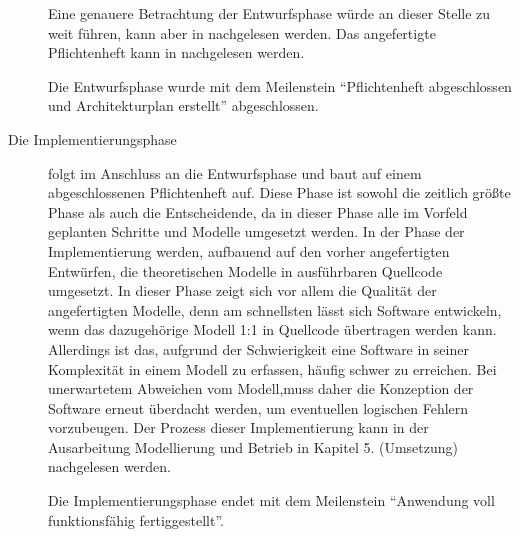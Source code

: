 \begin{description}
  Eine genauere Betrachtung der Entwurfsphase würde an dieser Stelle zu weit führen,
  kann aber in \citet{modelierungUndBetrieb2014} nachgelesen werden.
  Das angefertigte Pflichtenheft kann in \citet{pflichtenheft2013} nachgelesen werden.

  Die Entwurfsphase wurde mit dem Meilenstein "`Pflichtenheft abgeschlossen und
  Architekturplan erstellt"' abgeschlossen.

  \item[Die Implementierungsphase] folgt im Anschluss an die Entwurfsphase und
  baut auf einem abgeschlossenen Pflichtenheft auf. Diese Phase ist sowohl die
  zeitlich größte Phase als auch die Entscheidende, da in dieser Phase alle im
  Vorfeld geplanten Schritte und Modelle umgesetzt werden. In der Phase der
  Implementierung werden, aufbauend auf den vorher angefertigten Entwürfen, die
  theoretischen Modelle in ausführbaren Quellcode umgesetzt. In dieser Phase
  zeigt sich vor allem die Qualität der angefertigten Modelle, denn am
  schnellsten lässt sich Software entwickeln, wenn das dazugehörige Modell
  1:1 in Quellcode übertragen werden kann. Allerdings ist das, aufgrund der
  Schwierigkeit eine Software in seiner Komplexität in einem Modell zu erfassen,
  häufig schwer zu erreichen. Bei unerwartetem Abweichen vom Modell,muss daher
  die Konzeption der Software erneut überdacht werden, um eventuellen logischen
  Fehlern vorzubeugen. Der Prozess dieser Implementierung kann in der
  Ausarbeitung Modellierung und Betrieb in Kapitel 5. (Umsetzung) nachgelesen werden.

  Die Implementierungsphase endet mit dem Meilenstein "`Anwendung voll
  funktionsfähig fertiggestellt"'.


\end{description}
